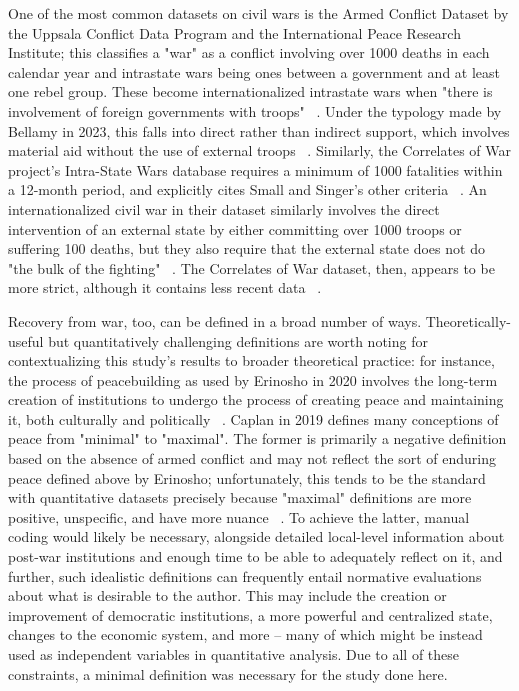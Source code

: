 \documentclass{article}
\begin{document}
One of the most common datasets on civil wars is the Armed Conflict Dataset by the Uppsala Conflict Data Program and the International Peace Research Institute; this classifies a "war" as a conflict involving over 1000 deaths in each calendar year and intrastate wars being ones between a government and at least one rebel group. These become internationalized intrastate wars when "there is involvement of foreign governments with troops" ~\cite{ucdp}. Under the typology made by Bellamy in 2023, this falls into direct rather than indirect support, which involves material aid without the use of external troops ~\cite{bellamy}. Similarly, the Correlates of War project's Intra-State Wars database requires a minimum of 1000 fatalities within a 12-month period, and explicitly cites Small and Singer's other criteria ~\cite{sarkees}. An internationalized civil war in their dataset similarly involves the direct intervention of an external state by either committing over 1000 troops or suffering 100 deaths, but they also require that the external state does not do "the bulk of the fighting" ~\cite{sarkees}. The Correlates of War dataset, then, appears to be more strict, although it contains less recent data ~\cite{cow}.

Recovery from war, too, can be defined in a broad number of ways. Theoretically-useful but quantitatively challenging definitions are worth noting for contextualizing this study's results to broader theoretical practice: for instance, the process of peacebuilding as used by Erinosho in 2020 involves the long-term creation of institutions to undergo the process of creating peace and maintaining it, both culturally and politically ~\cite{erinosho}. Caplan in 2019 defines many conceptions of peace from "minimal" to "maximal". The former is primarily a negative definition based on the absence of armed conflict and may not reflect the sort of enduring peace defined above by Erinosho; unfortunately, this tends to be the standard with quantitative datasets precisely because "maximal" definitions are more positive, unspecific, and have more nuance ~\cite{caplan}. To achieve the latter, manual coding would likely be necessary, alongside detailed local-level information about post-war institutions and enough time to be able to adequately reflect on it, and further, such idealistic definitions can frequently entail normative evaluations about what is desirable to the author. This may include the creation or improvement of democratic institutions, a more powerful and centralized state, changes to the economic system, and more -- many of which might be instead used as independent variables in quantitative analysis. Due to all of these constraints, a minimal definition was necessary for the study done here. 
\end{document}
